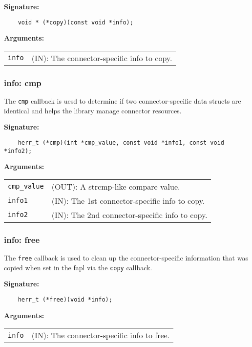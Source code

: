 \begin{mdframed}[style=bgbox]
\textbf{Signature:}
\begin{lstlisting}
    void * (*copy)(const void *info);
\end{lstlisting}
\textbf{Arguments:}\\
\begin{tabular}{l p{13.5cm}}
  \texttt{info} & (IN): The connector-specific info to copy.\\
\end{tabular}
\end{mdframed}

\subsubsection{info: cmp}
The \texttt{cmp} callback is uesd to determine if two connector-specific data structs are identical and helps the library manage connector resources.

\begin{mdframed}[style=bgbox]
\textbf{Signature:}
\begin{lstlisting}
    herr_t (*cmp)(int *cmp_value, const void *info1, const void *info2);
\end{lstlisting}
\textbf{Arguments:}\\
\begin{tabular}{l p{13.5cm}}
  \texttt{cmp\_value} & (OUT): A strcmp-like compare value.\\
  \texttt{info1} & (IN): The 1st connector-specific info to copy.\\
  \texttt{info2} & (IN): The 2nd connector-specific info to copy.\\
\end{tabular}
\end{mdframed}

\subsubsection{info: free}
The \texttt{free} callback is used to clean up the connector-specific information that was copied when set in the fapl via the \texttt{copy} callback.

\begin{mdframed}[style=bgbox]
\textbf{Signature:}
\begin{lstlisting}
    herr_t (*free)(void *info);
\end{lstlisting}
\textbf{Arguments:}\\
\begin{tabular}{l p{13.5cm}}
  \texttt{info} & (IN): The connector-specific info to free.\\
\end{tabular}
\end{mdframed}

